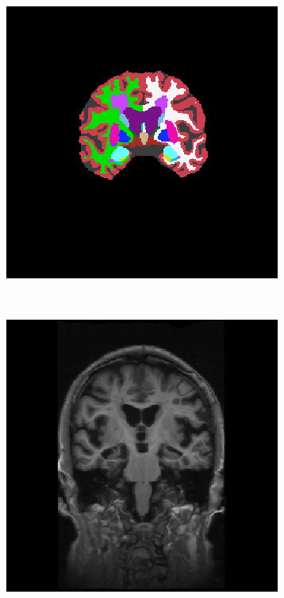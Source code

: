 \documentclass[10pt,twoside]{book}
\begin{document}
\begin{figure}
\begin{subfigure}{0.4\textwidth}
    \caption{}
    \label{fig:labelPropagation_b}
  \end{subfigure}
  \begin{subfigure}{0.4\textwidth}
    \centering
    \includegraphics[width=\textwidth]{labelFusion_voteFromSubject03_beforeANYRegistration}
    \caption{}
    \label{fig:labelPropagation_c}
  \end{subfigure}
  \\[2ex]
  \begin{subfigure}{0.4\textwidth}
    \centering
    \includegraphics[width=\textwidth]{orig03_warped}

\end{subfigure}
\end{figure}
\end{document}
